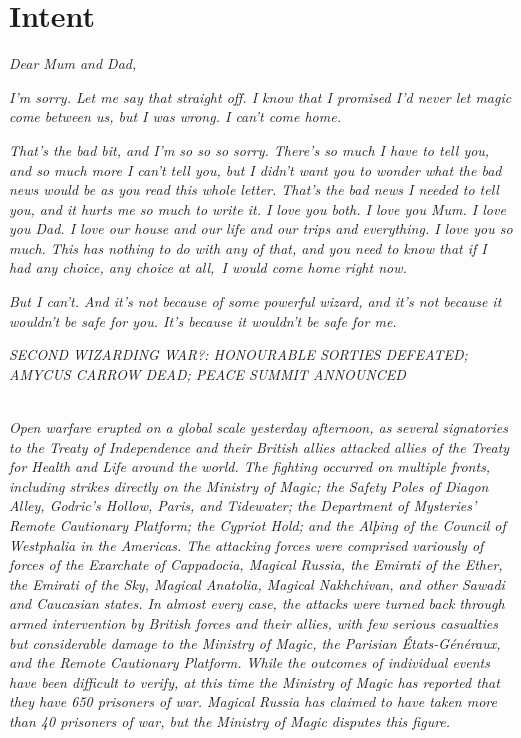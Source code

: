 \hypertarget{intent}{%
\chapter{Intent}\label{intent}}

\emph{Dear Mum and Dad,}

\emph{I'm sorry. Let me say that straight off. I know that I promised
I'd never let magic come between us, but I was wrong. I can't come
home.}

\emph{That's the bad bit, and I'm so so so sorry. There's so much I have
to tell you, and so much more I can't tell you, but I didn't want you to
wonder what the bad news would be as you read this whole letter. That's
the bad news I needed to tell you, and it hurts me so much to write it.
I love you both. I love you Mum. I love you Dad. I love our house and
our life and our trips and everything. I love you so much. This has
nothing to do with any of that, and you need to know that if I had any
choice, any choice at all,~I would come home right now.}

\emph{But I can't. And it's not because of some powerful wizard, and
it's not because it wouldn't be safe for you. It's because it wouldn't
be safe for me.}

\mybreak

\emph{SECOND WIZARDING WAR?: HONOURABLE SORTIES DEFEATED; AMYCUS CARROW
DEAD; PEACE SUMMIT ANNOUNCED}

\\

\emph{Open warfare erupted on a global scale yesterday afternoon, as
several signatories to the Treaty of Independence and their British
allies attacked allies of the Treaty for Health and Life around the
world. The fighting occurred on multiple fronts, including strikes
directly on the Ministry of Magic; the Safety Poles of Diagon Alley,
Godric's Hollow, Paris, and Tidewater; the Department of Mysteries'
Remote Cautionary Platform; the Cypriot Hold; and the Alþing of the
Council of Westphalia in the Americas. The attacking forces were
comprised variously of forces of the Exarchate of Cappadocia, Magical
Russia, the Emirati of the Ether, the Emirati of the Sky, Magical
Anatolia, Magical Nakhchivan, and other Sawadi and Caucasian states. In
almost every case, the attacks were turned back through armed
intervention by British forces and their allies, with few serious
casualties but considerable damage to the Ministry of Magic, the
Parisian États-Généraux, and the Remote Cautionary Platform. While the
outcomes of individual events have been difficult to verify, at this
time the Ministry of Magic has reported that they have 650 prisoners of
war. Magical Russia has claimed to have taken more than 40 prisoners of
war, but the Ministry of Magic disputes this figure.}


